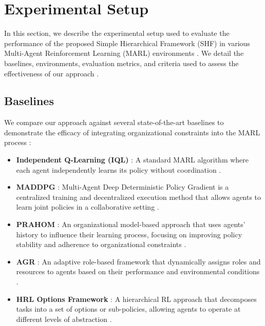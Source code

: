 \documentclass[sigconf,anonymous]{aamas}
\begin{document}
\section{Experimental Setup}
\label{sec:experimental_setup}

In this section, we describe the experimental setup used to evaluate the performance of the proposed Simple Hierarchical Framework (SHF) in various Multi-Agent Reinforcement Learning (MARL) environments \cite{hubner2010moise}. We detail the baselines, environments, evaluation metrics, and criteria used to assess the effectiveness of our approach \cite{foerster2018counterfactual, soule2024}.

\subsection{Baselines}
We compare our approach against several state-of-the-art baselines to demonstrate the efficacy of integrating organizational constraints into the MARL process \cite{foerster2018counterfactual}:

\begin{itemize}
    \item \textbf{Independent Q-Learning (IQL)} \cite{iql_reference}: A standard MARL algorithm where each agent independently learns its policy without coordination \cite{foerster2016learning}.
    \item \textbf{MADDPG} \cite{maddpg_reference}: Multi-Agent Deep Deterministic Policy Gradient is a centralized training and decentralized execution method that allows agents to learn joint policies in a collaborative setting \cite{lowe2017multi}.
    \item \textbf{PRAHOM} \cite{prahom_reference}: An organizational model-based approach that uses agents' history to influence their learning process, focusing on improving policy stability and adherence to organizational constraints \cite{hubner2010moise}.
    \item \textbf{AGR} \cite{agr_reference}: An adaptive role-based framework that dynamically assigns roles and resources to agents based on their performance and environmental conditions \cite{hernandez2019survey}.
    \item \textbf{HRL Options Framework} \cite{options_hrl_reference}: A hierarchical RL approach that decomposes tasks into a set of options or sub-policies, allowing agents to operate at different levels of abstraction \cite{foerster2018counterfactual}.
\end{itemize}
\end{document}
